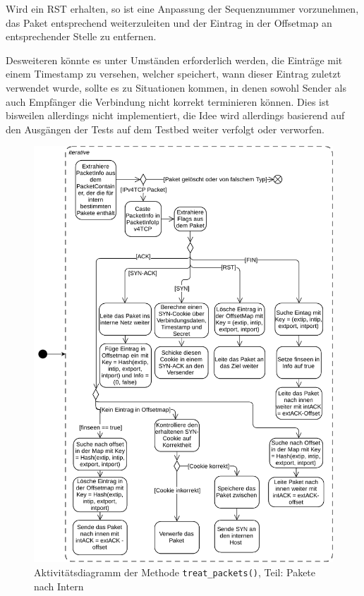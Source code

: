 \documentclass[../review_2.tex]{subfiles}
\begin{document}
Wird ein RST erhalten, so ist eine Anpassung der Sequenznummer vorzunehmen, das Paket entsprechend weiterzuleiten und der Eintrag in der Offsetmap an entsprechender Stelle zu entfernen.

Desweiteren könnte es unter Umständen erforderlich werden, die Einträge mit einem Timestamp zu versehen, welcher speichert, wann dieser Eintrag zuletzt verwendet wurde, sollte es zu Situationen kommen, in denen sowohl Sender als auch Empfänger die Verbindung nicht korrekt terminieren können. Dies ist bisweilen allerdings nicht implementiert, die Idee wird allerdings basierend auf den Ausgängen der Tests auf dem Testbed weiter verfolgt oder verworfen.

\begin{figure}[h]
    \centering
    \includegraphics[width=0.98\linewidth]{img/treat_packets_0.pdf}
    \caption{Aktivitätsdiagramm der Methode \texttt{treat\_packets()}, Teil: Pakete nach Intern}
    \label{Aktivität_treat_packet_0}
\end{figure}
\end{document}
